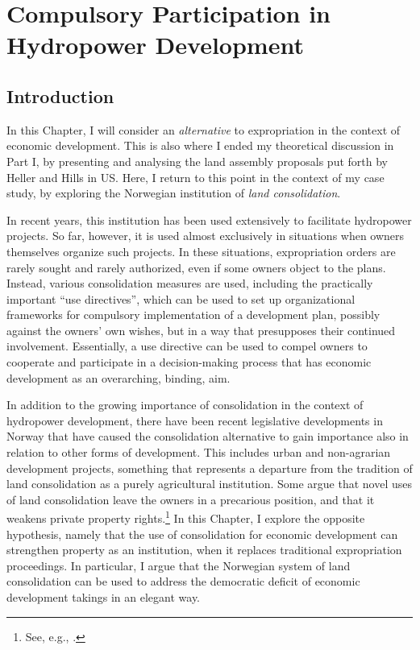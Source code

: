 \chapter{Compulsory Participation in Hydropower Development}\label{chap:6}

\section{Introduction}\label{sec:intro6}

In this Chapter, I will consider an {\it alternative} to expropriation in the context of economic development. This is also where I ended my theoretical discussion in Part I, by presenting and analysing the land assembly proposals put forth by Heller and Hills in US. Here, I return to this point in the context of my case study, by exploring the Norwegian institution of {\it land consolidation}. 

In recent years, this institution has been used extensively to facilitate hydropower projects. So far, however, it is used almost exclusively in situations when owners themselves organize such projects. In these situations, expropriation orders are rarely sought and rarely authorized, even if some owners object to the plans. Instead, various consolidation measures are used, including the practically important ``use directives'', which can be used to set up organizational frameworks for compulsory implementation of a development plan, possibly against the owners' own wishes, but in a way that presupposes their continued involvement. Essentially, a use directive can be used to compel owners to cooperate and participate in a decision-making process that has economic development as an overarching, binding, aim.

In addition to the growing importance of consolidation in the context of hydropower development, there have been recent legislative developments in Norway that have caused the consolidation alternative to gain importance also in relation to other forms of development. This includes urban and non-agrarian development projects, something that represents a departure from the tradition of land consolidation as a purely agricultural institution. Some argue that novel uses of land consolidation leave the owners in a precarious position, and that it weakens private property rights.\footnote{See, e.g., \cite{stenseth07}.} In this Chapter, I explore the opposite hypothesis, namely that the use of consolidation for economic development can strengthen property as an institution, when it replaces traditional expropriation proceedings. In particular, I argue that the Norwegian system of land consolidation can be used to address the democratic deficit of economic development takings in an elegant way.  

